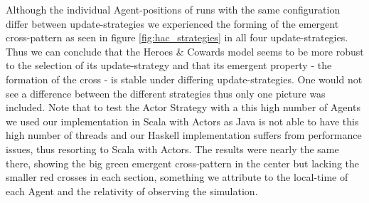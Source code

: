 Although the individual Agent-positions of runs with the same configuration differ between update-strategies we experienced the forming of the emergent cross-pattern as seen in figure \ref{fig:hac_strategies} in all four update-strategies. Thus we can conclude that the Heroes \& Cowards model seems to be more robust to the selection of its update-strategy and that its emergent property - the formation of the cross - is stable under differing update-strategies. One would not see a difference between the different strategies thus only one picture was included. Note that to test the Actor Strategy with a this high number of Agents we used our implementation in Scala with Actors as Java is not able to have this high number of threads and our Haskell implementation suffers from performance issues, thus resorting to Scala with Actors. The results were nearly the same there, showing the big green emergent cross-pattern in the center but lacking the smaller red crosses in each section, something we attribute to the local-time of each Agent and the relativity of observing the simulation.